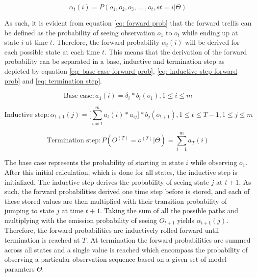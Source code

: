 \begin{equation}
    \alpha_t(i) = P(o_1, o_2, o_3,....,o_t, st = i | \Theta)
    \label{eq: forward prob}
\end{equation}

As such, it is evident from equation \ref{eq: forward prob} that the forward trellis can be defined as the probability of seeing observation $o_1 $ to $o_t$ while ending up at state $i$ at time $t$. Therefore, the forward probability $\alpha_t(i)$ will be derived for each possible state at each time $t$. This means that the derivation of the forward probability can be separated in a base, inductive and termination step as depicted by equation \ref{eq: base case forward prob}, \ref{eq: inductive step forward prob} and \ref{eq: termination step}.

\begin{equation}
    \text{Base case}:  a_1(i) = \delta_i*b_i(o_1),  1 \leq i \leq m
    \label{eq: base case forward prob}
\end{equation}

\begin{equation}
    \text{Inductive step}: \alpha_{t+1}(j) = \Big[\sum_{i=1}^m a_t(i)*a_{ij}\Big] * b_j(o_{t+1}), 1\leq t \leq T - 1,
    1 \leq j \leq m
    \label{eq: inductive step forward prob}
\end{equation}

\begin{equation}
    \text{Termination step}: P(O^{(T)} = o^{(T)}|\Theta) = \sum_{i=1}^m a_T(i)
    \label{eq: termination step}
\end{equation}

The base case represents the probability of starting in state $i$ while observing $o_1$. After this initial calculation, which is done for all states, the inductive step is initialized. The inductive step derives the probability of seeing state $j$ at $t+1$. As such, the forward probabilities derived one time step before is stored, and each of these stored values are then multiplied with their transition probability of jumping to state $j$ at time $t+1$. Taking the sum of all the possible paths and multiplying with the emission probability of seeing $O_{t+1}$ yields $\alpha_{t+1}(j)$. Therefore, the forward probabilities are inductively rolled forward until termination is reached at $T$. At termination the forward probabilities are summed across all states and a single value is reached which encompass the probability of observing a particular observation sequence based on a given set of model paramters $\Theta$.

